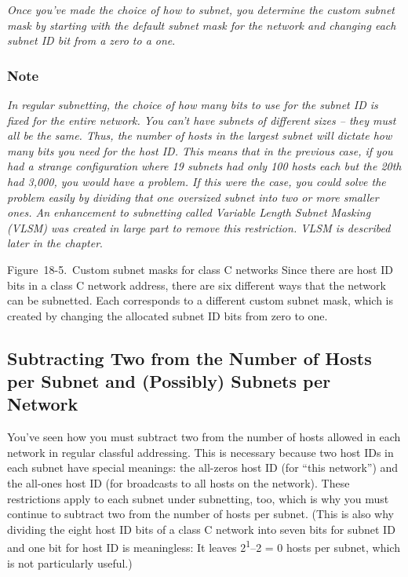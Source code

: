 {\emph{Once you've made the choice of how to subnet, you determine the
custom subnet mask by starting with the default subnet mask for the
network and changing each subnet ID bit from a zero to a one}}.

\subsubsection[Note]{\texorpdfstring{Note}{Note}}

{\emph{In regular subnetting, the choice of how many bits to use for the
subnet ID is fixed for the entire network. You can't have subnets of
different sizes -- they must all be the same. Thus, the number of hosts
in the largest subnet will dictate how many bits you need for the host
ID. This means that in the previous case, if you had a strange
configuration where 19 subnets had only 100 hosts each but the 20th had
3,000, you would have a problem. If this were the case, you could solve
the problem easily by dividing that one oversized subnet into two or
more smaller ones. An enhancement to subnetting called Variable Length
Subnet Masking (VLSM) was created in large part to remove this
restriction.
VLSM is described later in the chapter}}.





Figure~18-5.~Custom subnet masks for class C networks Since there are
host ID bits in a class C network address, there are six different ways
that the network can be subnetted. Each corresponds to a different
custom subnet mask, which is created by changing the allocated subnet ID
bits from zero to one.

\subsection[Subtracting Two from the Number of Hosts per Subnet and
(Possibly) Subnets per
Network]{\texorpdfstring{Subtracting
Two from the Number of Hosts per Subnet and (Possibly) Subnets per
Network}{Subtracting Two from the Number of Hosts per Subnet and (Possibly) Subnets per Network}}

You've seen how you must subtract two from the number of hosts allowed
in each network in regular classful addressing. This is necessary
because two host IDs in each subnet have special meanings: the all-zeros
host ID (for ``this network'') and the all-ones host ID (for broadcasts to
all hosts on the network). These restrictions apply to each subnet under
subnetting, too, which is why you must continue to subtract two from the
number of hosts per subnet. (This is also why dividing the eight host ID
bits of a class C network into seven bits for subnet ID and one bit for
host ID is meaningless: It leaves
2\textsuperscript{1}--2
= 0 hosts per subnet, which is not particularly useful.)

